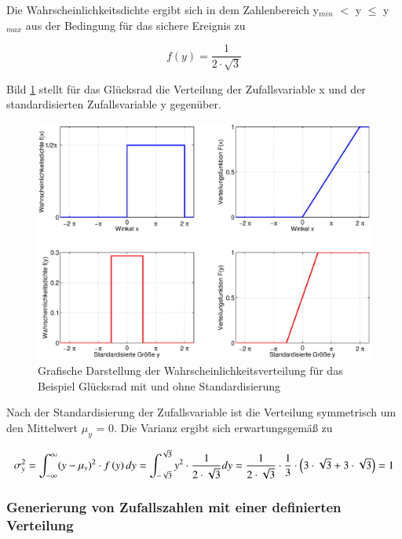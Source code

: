 \noindent Die Wahrscheinlichkeitsdichte ergibt sich in dem Zahlenbereich y$_{min}$ $\mathrm{<}$ y $\leq$ y$_{max}$ aus der Bedingung f\"{u}r das sichere Ereignis zu

\begin{equation}\label{eq:fourhundredeight}
f(y)=\dfrac{1}{2\cdot \sqrt{3}}
\end{equation}

Bild \ref{fig:Standardisierung} stellt f\"{u}r das Gl\"{u}cksrad die Verteilung der Zufallsvariable x und der standardisierten Zufallsvariable y gegen\"{u}ber.

\noindent 
\begin{figure}[H]
  \centerline{\includegraphics[width=1\textwidth]{Kapitel4/Bilder/image8}}
  \caption{Grafische Darstellung der Wahrscheinlichkeitsverteilung f\"{u}r das Beispiel Gl\"{u}cksrad mit und ohne Standardisierung}
  \label{fig:Standardisierung}
\end{figure}

\noindent Nach der Standardisierung der Zufallsvariable ist die Verteilung symmetrisch um den Mittelwert $\mu_{y}$ = 0. Die Varianz ergibt sich erwartungsgem\"{a}{\ss} zu

\begin{equation}\label{eq:fourhundrednine}
\sigma _{y}^{2} =\int _{-\infty}^{\infty}(y-\mu _{y})^{2} \cdot {f}\left(y\right){dy} =\int _{-\sqrt{3}}^{\sqrt{3}}y^{2} \cdot \dfrac{1}{2\cdot \sqrt{3}} {dy} =\dfrac{{\rm 1}}{2\cdot \sqrt{3}} \cdot \dfrac{1}{3} \cdot \left(3\cdot \sqrt{3} +3\cdot \sqrt{3} \right)=1
\end{equation}

\subsubsection{Generierung von Zufallszahlen mit einer definierten Verteilung}

